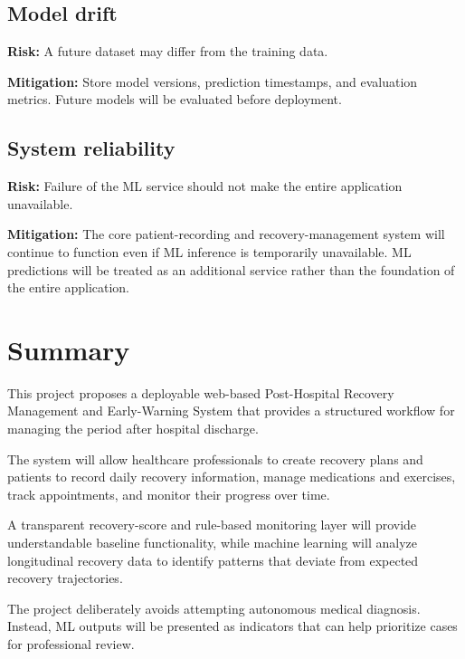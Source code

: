\documentclass[11pt,a4paper]{article}
\begin{document}
\subsection{Model drift}

\textbf{Risk:} A future dataset may differ from the training data.

\textbf{Mitigation:}
Store model versions, prediction timestamps, and evaluation
metrics. Future models will be evaluated before deployment.

\subsection{System reliability}

\textbf{Risk:} Failure of the ML service should not make the entire
application unavailable.

\textbf{Mitigation:}
The core patient-recording and recovery-management system
will continue to function even if ML inference is temporarily unavailable. ML
predictions will be treated as an additional service rather than the foundation
of the entire application.

\section{Summary}

This project proposes a deployable web-based Post-Hospital
Recovery Management and Early-Warning System that provides a structured
workflow for managing the period after hospital discharge.

The system will allow healthcare professionals to create
recovery plans and patients to record daily recovery information, manage
medications and exercises, track appointments, and monitor their progress over
time.

A transparent recovery-score and rule-based monitoring layer
will provide understandable baseline functionality, while machine learning will
analyze longitudinal recovery data to identify patterns that deviate from
expected recovery trajectories.

The project deliberately avoids attempting autonomous medical
diagnosis. Instead, ML outputs will be presented as indicators that can help
prioritize cases for professional review.
\end{document}

